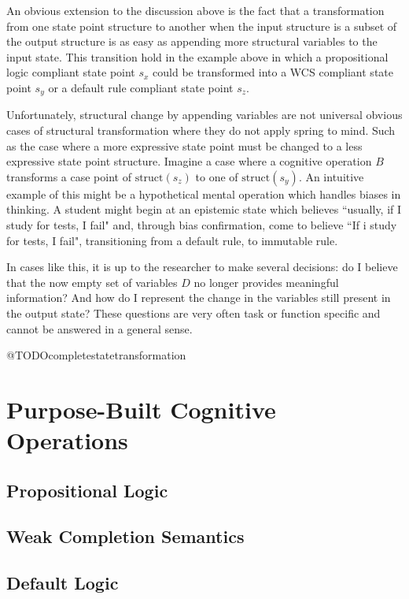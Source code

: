 \documentclass[
11pt, %
english, %
singlespacing, %
headsepline, %
]{MastersDoctoralThesis} %
\begin{document}
An obvious extension to the discussion above is the fact that a transformation from one state point structure to another when the input structure is a subset of the output structure is as easy as appending more structural variables to the input state. This transition hold in the example above in which a propositional logic compliant state point $s_x$ could be transformed into a WCS compliant state point $s_y$ or a default rule compliant state point $s_z$.

Unfortunately, structural change by appending variables are not universal obvious cases of structural transformation where they do not apply spring to mind. Such as the case where a more expressive state point must be changed to a less expressive state point structure. Imagine a case where a cognitive operation $B$ transforms a case point of $\textrm{struct}(s_z)$ to one of $\textrm{struct}(s_y)$. An intuitive example of this might be a hypothetical mental operation which handles biases in thinking. A student might begin at an epistemic state which believes ``usually, if I study for tests, I fail" and, through bias confirmation, come to believe ``If i study for tests, I fail", transitioning from a default rule, to immutable rule. 

In cases like this, it is up to the researcher to make several decisions: do I believe that the now empty set of variables $D$ no longer provides meaningful information? And how do I represent the change in the variables still present in the output state? These questions are very often task or function specific and cannot be answered in a general sense.

@TODOcompletestatetransformation

\section{Purpose-Built Cognitive Operations}
\subsection{Propositional Logic}
\subsection{Weak Completion Semantics}
\subsection{Default Logic}
\end{document}
